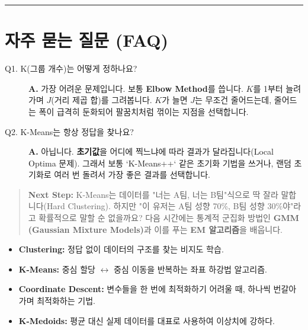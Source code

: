 \documentclass[11pt,a4paper]{book}
\theoremstyle{definition}
\begin{document}
\vspace{0.5cm}\hrule\vspace{0.5cm}

\section{자주 묻는 질문 (FAQ)}

\begin{description}
    \item[Q1. K(그룹 개수)는 어떻게 정하나요?]
    \textbf{A.} 가장 어려운 문제입니다. 보통 \textbf{Elbow Method}를 씁니다. $K$를 1부터 늘려가며 $J$(거리 제곱 합)를 그려봅니다. $K$가 늘면 $J$는 무조건 줄어드는데, 줄어드는 폭이 급격히 둔화되어 팔꿈치처럼 꺾이는 지점을 선택합니다.
    
    \item[Q2. K-Means는 항상 정답을 찾나요?]
    \textbf{A.} 아닙니다. \textbf{초기값}을 어디에 찍느냐에 따라 결과가 달라집니다(Local Optima 문제). 그래서 보통 `K-Means++` 같은 초기화 기법을 쓰거나, 랜덤 초기화로 여러 번 돌려서 가장 좋은 결과를 선택합니다.
\end{description}

\vspace{1cm}
\begin{quote}
\textbf{Next Step:} K-Means는 데이터를 "너는 A팀, 너는 B팀"식으로 딱 잘라 말합니다(Hard Clustering). 하지만 "이 유저는 A팀 성향 70\%, B팀 성향 30\%야"라고 확률적으로 말할 순 없을까요? 다음 시간에는 통계적 군집화 방법인 \textbf{GMM (Gaussian Mixture Models)}과 이를 푸는 \textbf{EM 알고리즘}을 배웁니다.
\end{quote}

\begin{summarybox}[title={Unit 4 핵심 요약}]
\begin{itemize}
    \item \textbf{Clustering:} 정답 없이 데이터의 구조를 찾는 비지도 학습.
    \item \textbf{K-Means:} 중심 할당 $\leftrightarrow$ 중심 이동을 반복하는 좌표 하강법 알고리즘.
    \item \textbf{Coordinate Descent:} 변수들을 한 번에 최적화하기 어려울 때, 하나씩 번갈아 가며 최적화하는 기법.
    \item \textbf{K-Medoids:} 평균 대신 실제 데이터를 대표로 사용하여 이상치에 강하다.
\end{itemize}
\end{summarybox}


\end{document}
